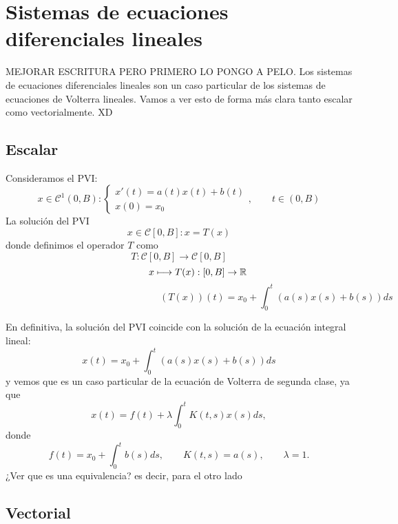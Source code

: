 \chapter{Sistemas de ecuaciones diferenciales lineales}
MEJORAR ESCRITURA PERO PRIMERO LO PONGO A PELO.
Los sistemas de ecuaciones diferenciales lineales son un caso particular de los sistemas de ecuaciones de Volterra lineales. Vamos a ver esto de forma más clara tanto escalar como vectorialmente. XD
\section{Escalar}
Consideramos el PVI:
\begin{equation}
	x \in \mathcal{C}^1(0,B):\left\lbrace\begin{array}{c} x'(t) = a(t)x(t)+b(t) \\ x(0) = x_0 \end{array}\right.,\qquad t \in (0,B)
\end{equation}
La solución del PVI \begin{equation}
	x \in \mathcal{C}[0,B]: x = T(x)
\end{equation}
donde definimos el operador $T$ como
\begin{equation}
	T: \mathcal{C}[0,B] \longrightarrow \mathcal{C}[0,B]
\end{equation}
\begin{equation}
	\qquad \qquad x \longmapsto T(x): [0,B] \rightarrow \mathbb{R}
\end{equation}
\begin{equation}
	\qquad \qquad \qquad \qquad \qquad \qquad \qquad \qquad (T(x))(t) = x_0 + \int_0^t(a(s)x(s)+b(s))ds
\end{equation}

En definitiva, la solución del PVI coincide con la solución de la ecuación integral lineal:
\begin{equation}
	x(t) = x_0 + \int_0^t (a(s)x(s)+b(s))ds
\end{equation}
y vemos que es un caso particular de la ecuación de Volterra de segunda clase, ya que
\begin{equation}
	x(t) = f(t) + \lambda \int_0^t K(t,s)x(s)ds,
\end{equation}
donde
\begin{equation}
	f(t) = x_0 + \int_0^t b(s)ds, \qquad K(t,s) = a(s), \qquad \lambda = 1.
\end{equation}
¿Ver que es una equivalencia? es decir, para el otro lado
\section{Vectorial}

\endinput
-